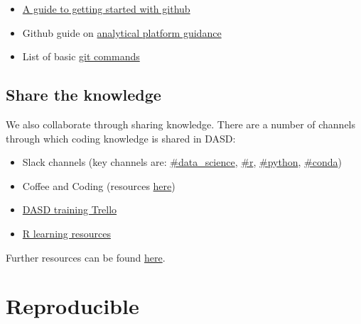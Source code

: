 \documentclass[]{book}
\providecommand{\tightlist}{%
  \setlength{\itemsep}{0pt}\setlength{\parskip}{0pt}}
\begin{document}
\begin{itemize}
\tightlist
\item
  \href{https://jennybc.github.io/2014-05-12-ubc/ubc-r/session2.4_github.html}{A guide to getting started with github}\\
\item
  Github guide on \href{https://user-guidance.services.alpha.mojanalytics.xyz/github.html\#creating-your-project-repo-on-github}{analytical platform guidance}\\
\item
  List of basic \href{https://guides.github.com/introduction/git-handbook/}{git commands}
\end{itemize}

\hypertarget{knowledge}{%
\section{Share the knowledge}\label{knowledge}}

We also collaborate through sharing knowledge. There are a number of channels through which coding knowledge is shared in DASD:

\begin{itemize}
\tightlist
\item
  Slack channels (key channels are: \href{https://app.slack.com/client/T1PU1AP6D/C1Z8Q18LS}{\#data\_science}, \href{https://app.slack.com/client/T1PU1AP6D/C1PUCG719}{\#r}, \href{https://app.slack.com/client/T1PU1AP6D/C1Q09V86S}{\#python}, \href{https://app.slack.com/client/T1PU1AP6D/CSP8603CK}{\#conda})\\
\item
  Coffee and Coding (resources \href{https://github.com/moj-analytical-services/Coffee-and-Coding}{here})\\
\item
  \href{https://trello.com/b/zAwm6sCc/dasd-training}{DASD training Trello}\\
\item
  \href{https://docs.google.com/document/d/1R4hBMf26T9HEnCdVz56PpZhwiCv5RhberYL3BxOSKsA/edit}{R learning resources}
\end{itemize}

Further resources can be found \protect\hyperlink{ksresources}{here}.

\hypertarget{reproduce}{%
\chapter{Reproducible}\label{reproduce}}
\end{document}
